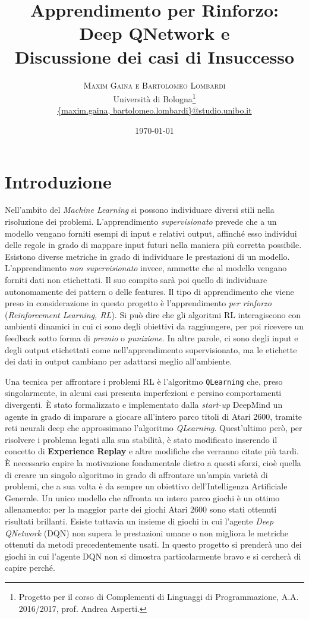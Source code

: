\documentclass[twoside,twocolumn,10pt]{extarticle}
\title{Apprendimento per Rinforzo:\\Deep Q\texttwelveudash Network e\\ Discussione dei casi di Insuccesso} %
\author{%
\textsc{Maxim Gaina e Bartolomeo Lombardi} \\[1ex] %
\normalsize Università di Bologna\thanks{Progetto per il corso di Complementi di Linguaggi di Programmazione, A.A. 2016/2017, prof. Andrea Asperti.} \\ %
\normalsize \href{mailto:maxim.gaina@studio.unibo.it}{\{maxim.gaina, bartolomeo.lombardi\}@studio.unibo.it}
}
\date{\today} %
\theoremstyle{definition}
\begin{document}
\maketitle

\tableofcontents

\section*{Introduzione}
	\lettrine[nindent = 0.4em,lines=3]{N}\space\MakeTextLowercase{e}ll'ambito del \textit{Machine Learning} si possono individuare diversi stili nella risoluzione dei problemi. L'apprendimento \textit{supervisionato} prevede che a un modello vengano forniti esempi di input e relativi output, affinché esso individui delle regole in grado di mappare input futuri nella maniera più corretta possibile. Esistono diverse metriche in grado di individuare le prestazioni di un modello. L'apprendimento \textit{non supervisionato} invece, ammette che al modello vengano forniti dati non etichettati. Il suo compito sarà poi quello di individuare autonomamente dei pattern o delle features. Il tipo di apprendimento che viene preso in considerazione in questo progetto è l'apprendimento \textit{per rinforzo} (\textit{Reinforcement Learning, RL}). Si può dire che gli algoritmi RL interagiscono con ambienti dinamici in cui ci sono degli obiettivi da raggiungere, per poi ricevere un feedback sotto forma di \textit{premio} o \textit{punizione}. In altre parole, ci sono degli input e degli output etichettati come nell'apprendimento supervisionato, ma le etichette dei dati in output cambiano per adattarsi meglio all'ambiente.
	
	Una tecnica per affrontare i problemi RL è l'algoritmo \texttt{Q\texttwelveudash Learning} che, preso singolarmente, in alcuni casi presenta imperfezioni e persino comportamenti divergenti. È stato formalizzato e implementato dalla \textit{start-up} DeepMind un agente in grado di imparare a giocare all'intero parco titoli di Atari 2600, tramite reti neurali deep che approssimano l'algoritmo \textit{Q\texttwelveudash Learning}. Quest'ultimo però, per risolvere i problema legati alla sua stabilità, è stato modificato inserendo il concetto di \textbf{Experience Replay} e altre modifiche che verranno citate più tardi. È necessario capire la motivazione fondamentale dietro a questi sforzi, cioè quella di creare un singolo algoritmo in grado di affrontare un'ampia varietà di problemi, che a sua volta è da sempre un obiettivo dell'Intelligenza Artificiale Generale. Un unico modello che affronta un intero parco giochi è un ottimo allenamento: per la maggior parte dei giochi Atari 2600 sono stati ottenuti risultati brillanti. Esiste tuttavia un insieme di giochi in cui l'agente \textit{Deep Q\texttwelveudash Network} (DQN) non supera le prestazioni umane o non migliora le metriche ottenuti da metodi precedentemente usati. In questo progetto si prenderà uno dei giochi in cui l'agente DQN non si dimostra particolarmente bravo e si cercherà di capire perché.
	
\end{document}
